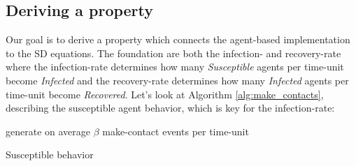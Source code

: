 %
%
%

%

\subsection{Deriving a property}
Our goal is to derive a property which connects the agent-based implementation to the SD equations. The foundation are both the infection- and recovery-rate where the infection-rate determines how many \textit{Susceptible} agents per time-unit become \textit{Infected} and the recovery-rate determines how many \textit{Infected} agents per time-unit become \textit{Recovered}. Let's look at Algorithm \ref{alg:make_contacts}, describing the susceptible agent behavior, which is key for the infection-rate:

\begin{algorithm}
generate on average $\beta$ make-contact events per time-unit\; 
\caption{Susceptible behavior}
\label{alg:make_contacts}
\end{algorithm}

